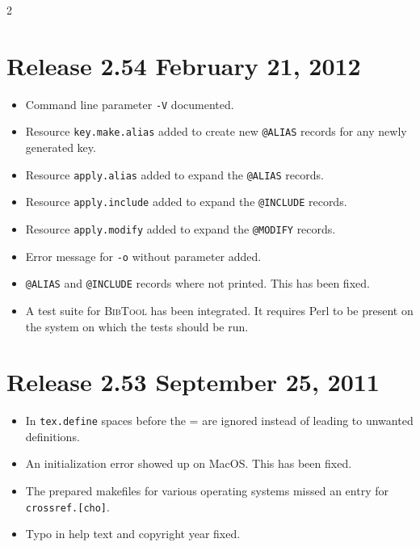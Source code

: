 \documentclass[11pt,a4paper]{scrartcl}
\newcommand\Arg[1]{\texttt{#1}}
\newcommand\rsc[1]{\texttt{#1}}
\newcommand\BibTool{\textsc{BibTool}}
\newenvironment{Releases}{\begin{multicols}2\RaggedRight}{\end{multicols}}
\newenvironment{Release}[2]{%
  \def\tmp{#2}%
  \section*{Release #1 \ifx\tmp\empty\else{\normalsize[#2]}\fi}
  \begin{itemize}
}{\end{itemize}}
\newenvironment{Fix}[1]{\item }{}
\newenvironment{New}[1]{\item }{}
\newenvironment{Update}[1]{\item }{}
\begin{document}
\begin{Releases}
 \begin{Release}{2.54}{February 21, 2012}
  \begin{New}{gene}
    Command line parameter \Arg{-V} documented.
  \end{New}
  \begin{New}{gene}
    Resource \rsc{key.make.alias} added to create new \texttt{@ALIAS}
    records for any newly generated key.
  \end{New}
  \begin{New}{gene}
    Resource \rsc{apply.alias} added to expand the \texttt{@ALIAS}
    records.
  \end{New}
  \begin{New}{gene}
    Resource \rsc{apply.include} added to expand the \texttt{@INCLUDE}
    records.
  \end{New}
  \begin{New}{gene}
    Resource \rsc{apply.modify} added to expand the \texttt{@MODIFY}
    records.
  \end{New}
  \begin{Update}{gene}
    Error message for \Arg{-o} without parameter added.
  \end{Update}
  \begin{Fix}{gene}
    \texttt{@ALIAS} and \texttt{@INCLUDE} records where not printed.
    This has been fixed.
  \end{Fix}
  \begin{New}{gene}
    A test suite for \BibTool{} has been integrated. It requires Perl
    to be present on the system on which the tests should be run.
  \end{New}
 \end{Release}

 \begin{Release}{2.53}{September 25, 2011}
  \begin{Update}{gene}
    In \texttt{tex.define} spaces before the = are ignored instead of
    leading to unwanted definitions.
  \end{Update}
  \begin{Fix}{gene}
    An initialization error showed up on MacOS. This has been fixed.
  \end{Fix}
  \begin{Fix}{gene}
    The prepared makefiles for various operating systems missed an
    entry for \texttt{crossref.[cho]}.
  \end{Fix}
  \begin{Fix}{gene}
    Typo in help text and copyright year fixed.
  \end{Fix}
 \end{Release}


\end{Releases}
\end{document}
